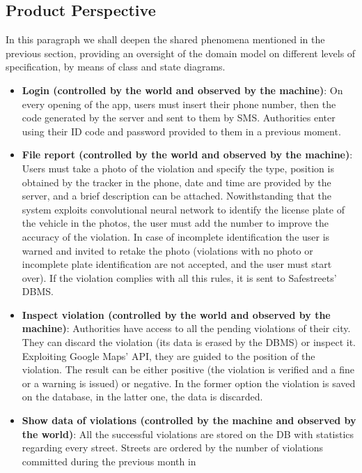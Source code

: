 \subsection {Product Perspective}

In this paragraph we shall deepen the shared phenomena mentioned in 
the previous section, providing an oversight of the domain model on 
different levels of specification, by means of class and state diagrams.

\begin{itemize}
    \item \textbf{Login (controlled by the world and observed by the machine)}: 
    On every opening of the app, users must insert their phone number, then 
    the code generated by the server and sent to them by SMS. Authorities 
    enter using their ID code and password provided to them in a previous moment.
    \item \textbf{File report (controlled by the world and observed by the machine)}: 
    Users must take a photo of the violation and specify the type, position is 
    obtained by the tracker in the phone, date and time are provided by the server, 
    and a brief description can be attached. Nowithstanding that the system exploits 
    convolutional neural network to identify the license plate of the vehicle in the 
    photos, the user must add the number to improve the accuracy of the violation. 
    In case of incomplete identification the user is warned and invited to retake 
    the photo (violations with no photo or incomplete plate identification are not 
    accepted, and the user must start over). If the violation complies with all 
    this rules, it is sent to Safestreets' DBMS.
    \item \textbf{Inspect violation (controlled by the world and observed by the machine)}: 
    Authorities have access to all the pending violations of their city. They can discard 
    the violation (its data is erased by the DBMS) or inspect it. Exploiting Google Maps' 
    API, they are guided to the position of the violation. The result can be either 
    positive (the violation is verified and a fine or a warning is issued) or negative. 
    In the former option the violation is saved on the database, in the latter one, 
    the data is discarded.
    \item \textbf{Show data of violations (controlled by the machine and observed by the world)}: 
    All the successful violations are stored on the DB with statistics regarding every street. 
    Streets are ordered by the number of violations committed during the previous month in 

\end{itemize}
